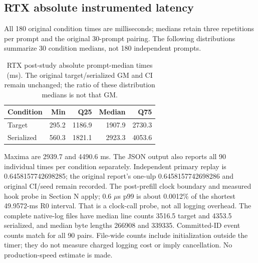 \subsection{RTX absolute instrumented latency}
All 180 original condition times are milliseconds; medians retain three repetitions per prompt and the original 30-prompt pairing. The following distributions summarize 30 condition medians, not 180 independent prompts.
\begin{table}[t]
\caption{RTX post-study absolute prompt-median times (ms). The original target/serialized GM and CI remain unchanged; the ratio of these distribution medians is not that GM.}
\label{tab:rtxabsolutetime}
\centering
\begin{tabular}{lrrrr}
\toprule
Condition & Min & Q25 & Median & Q75 \\
\midrule
Target & 295.2 & 1186.9 & 1907.9 & 2730.3 \\
Serialized & 560.3 & 1821.1 & 2923.3 & 4053.6 \\
\bottomrule
\end{tabular}
\end{table}
Maxima are 2939.7 and 4490.6 ms. The JSON output also reports all 90 individual times per condition separately. Independent primary replay is 0.6458157742698285; the original report's one-ulp 0.6458157742698286 and original CI/seed remain recorded. The post-prefill clock boundary and measured hook probe in Section N apply; 0.6 $\mu$s p99 is about 0.0012\% of the shortest 49.9572-ms R0 interval. That is a clock-call probe, not all logging overhead. The complete native-log files have median line counts 3516.5 target and 4353.5 serialized, and median byte lengths 266908 and 339335. Committed-ID event counts match for all 90 pairs. File-wide counts include initialization outside the timer; they do not measure charged logging cost or imply cancellation. No production-speed estimate is made.
